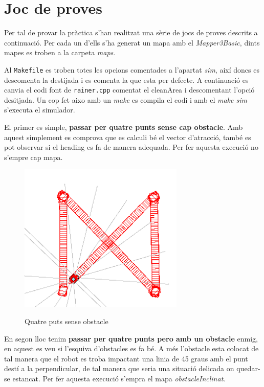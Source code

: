 \section{Joc de proves}

Per tal de provar la pràctica s'han realitzat una sèrie de jocs de proves
descrits a continuació. Per cada un d'ells s'ha generat un mapa amb el \emph{Mapper3Basic},
dints mapes es troben a la carpeta \emph{maps}.

Al \texttt{Makefile} es troben totes les opcions comentades a l'apartat \emph{sim}, així doncs
es descomenta la destijada i es comenta la que esta per defecte. A continuació es canvia el codi font
de \texttt{rainer.cpp} comentat el cleanArea i descomentant l'opció desitjada. Un cop fet aixo amb un \emph{make}
es compila el codi i amb el \emph{make sim} s'executa el simulador.

El primer es simple, \textbf{passar per quatre punts sense cap obstacle}. Amb aquest simplement es comprova que es calculi
bé el vector d'atracció, també es pot observar si el heading es fa de manera adequada. Per fer aquesta 
execució no s'empre cap mapa.

\begin{figure}[H]
\begin{center}\label{4punts}
 \includegraphics[width=0.7\textwidth]{diagrames/figures/4punts.png}
\end{center}
  \caption{Quatre puts sense obstacle}
\end{figure}


En segon lloc tenim \textbf{passar per quatre punts pero amb un obstacle} enmig, en aquest es veu si l'esquiva d'obstacles
es fa bé. A més l'obstacle esta colocat de tal manera que el robot es troba impactant una linia de 45 graus
amb el punt destí a la perpendicular, de tal manera que seria una situació delicada on quedar-se estancat.
Per fer aquesta execució s'empra el mapa \emph{obstacleInclinat}.

